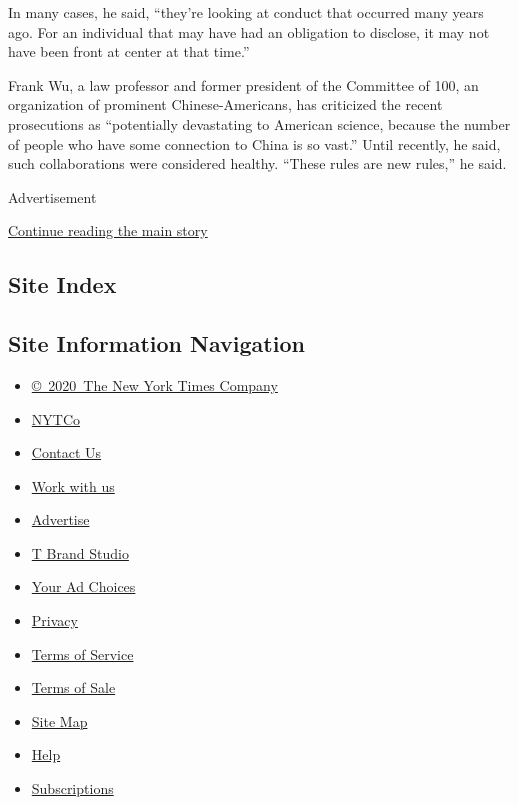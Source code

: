 In many cases, he said, ``they're looking at conduct that occurred many
years ago. For an individual that may have had an obligation to
disclose, it may not have been front at center at that time.''

Frank Wu, a law professor and former president of the Committee of 100,
an organization of prominent Chinese-Americans, has criticized the
recent prosecutions as ``potentially devastating to American science,
because the number of people who have some connection to China is so
vast.'' Until recently, he said, such collaborations were considered
healthy. ``These rules are new rules,'' he said.

Advertisement

\protect\hyperlink{after-bottom}{Continue reading the main story}

\hypertarget{site-index}{%
\subsection{Site Index}\label{site-index}}

\hypertarget{site-information-navigation}{%
\subsection{Site Information
Navigation}\label{site-information-navigation}}

\begin{itemize}
\tightlist
\item
  \href{https://help.nytimes.com/hc/en-us/articles/115014792127-Copyright-notice}{©~2020~The
  New York Times Company}
\end{itemize}

\begin{itemize}
\tightlist
\item
  \href{https://www.nytco.com/}{NYTCo}
\item
  \href{https://help.nytimes.com/hc/en-us/articles/115015385887-Contact-Us}{Contact
  Us}
\item
  \href{https://www.nytco.com/careers/}{Work with us}
\item
  \href{https://nytmediakit.com/}{Advertise}
\item
  \href{http://www.tbrandstudio.com/}{T Brand Studio}
\item
  \href{https://www.nytimes.com/privacy/cookie-policy\#how-do-i-manage-trackers}{Your
  Ad Choices}
\item
  \href{https://www.nytimes.com/privacy}{Privacy}
\item
  \href{https://help.nytimes.com/hc/en-us/articles/115014893428-Terms-of-service}{Terms
  of Service}
\item
  \href{https://help.nytimes.com/hc/en-us/articles/115014893968-Terms-of-sale}{Terms
  of Sale}
\item
  \href{https://spiderbites.nytimes.com}{Site Map}
\item
  \href{https://help.nytimes.com/hc/en-us}{Help}
\item
  \href{https://www.nytimes.com/subscription?campaignId=37WXW}{Subscriptions}
\end{itemize}
